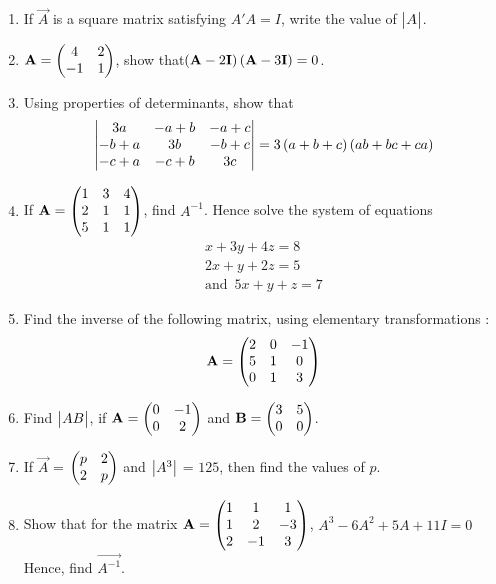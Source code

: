\begin{enumerate}
\item If $\vec{A}$ is a square matrix satisfying $A'A = I$, write the value of $\begin{vmatrix}A\end{vmatrix}$.

\item $\mathbf{A}= \begin{pmatrix}4&2\\-1& 1\end{pmatrix}$, show that$\left(\mathbf{A}-2\mathbf{I}\right)\left(\mathbf{A}-3\mathbf{I}\right)= 0$.

\item Using properties of determinants, show that 
\begin{align*}
\begin{vmatrix}3a & -a+b & -a+c \\ -b+a & 3b & -b+c \\ -c+a & -c+b & 3c\end{vmatrix} = 3\left(a+b+c\right)\left(ab+bc+ca\right)
\end{align*}

\item If ${\mathbf{A}} = \begin{pmatrix}1&3&4\\2&1&1\\5&1&1\end{pmatrix}$, find $A^{-1}$.
        Hence solve the system of equations 
            \begin{align*}
                {x+3y+4z}=8 \\
                {2x+y+2z}=5 \\
            \text{and}\hspace{6pt} {5x+y+z} =7
            \end{align*}    
         
  \item Find the inverse of the following matrix, using elementary transformations :
                \begin{align*}
                {\mathbf{A}} = \begin{pmatrix}2&0&-1\\5&1&0\\ 0&1&3\end{pmatrix}
                \end{align*}
                
\item Find $\begin{vmatrix}AB\end{vmatrix}$, if $\mathbf{A}=\begin{pmatrix}0&-1 \\ 0&2\end{pmatrix}$ and $\mathbf{B}=\begin{pmatrix}3&5 \\ 0&0\end{pmatrix}$.

\item If $\vec{A}$ = $\begin{pmatrix}p&2 \\ 2&p\end{pmatrix}$ and $\begin{vmatrix}A^3\end{vmatrix}$ = $125$, then find the values of $p$.

\item Show that for the matrix $\mathbf{A}=\begin{pmatrix}1&1&1 \\ 1&2&-3 \\ 2&-1&3\end{pmatrix}$, ${A}^3-6{A}^2+5{A}+11{I}=0$
Hence, find $\vec{A^{-1}}$.


\end{enumerate}
